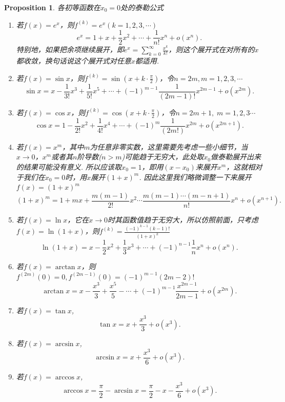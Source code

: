 \documentclass{article}
\newtheorem{proposition}[theorem]{Proposition}
\begin{document}
\begin{proposition}
\rm {\color{red}各初等函数在$x_0 = 0$处的泰勒公式}
\begin{enumerate}
	\item {\color{red}若$f(x) = e^x$}，则$f^{(k)} = e^x(k=1,2,3,\cdots)$
	$$
	e^x = 1 + x + \frac{1}{2}x^2 + \cdots + \frac{1}{n!}x^n + o(x^n). 
	$$
	特别地，如果把余项继续展开，即$e^x =\sum\limits_{k=0}^{\infty}\frac{x^k}{k!}$，则这个展开式在对所有的$x$都收敛，换句话说这个展开式对任意$x$都适用.
	\item {\color{red}若$f(x) = \sin x$}，则$f^{(k)} = \sin (x+ k\cdot \frac{\pi}{2})$，令$n=2m, m = 1,2,3,\cdots$
	$$
	\sin x = x - \frac{1}{3!}x^3 + \frac{1}{5!}x^5 + \cdots + (-1)^{m-1}\frac{1}{(2m-1)!}x^{2m-1}+o(x^{2m}).
	$$
	\item {\color{red}若$f(x) = \cos x$}，则$f^{(k)} = \cos (x+k\cdot \frac{\pi}{2})$，令$n=2m+1,\; m = 1,2,3\cdots$
	$$
	\cos x = 1 - \frac{1}{2!}x^2 + \frac{1}{4!}x^4 + \cdots + (-1)^{m} \frac{1}{(2m!)}x^{2m} + o(x^{2m+1}).
	$$
	\item {\color{red}若$f(x)=x^m$}，其中$m$为任意非零实数，这里需要先考虑一些小细节，当$x \rightarrow 0$，$x^m$或者其$n$阶导数($n > m$)可能趋于无穷大，此处取$x_0$做泰勒展开出来的结果可能没有意义. 所以应该取$x_0 = 1$，即用$(x-x_0)$来展开$x^m$，这就相对于我们在$x_0 = 0$时，用$x$展开$(1+x)^m$. 因此这里我们略微调整一下来展开$f(x) = (1+x)^m$
	$$
	(1+x)^m = 1 + mx + \frac{m(m-1)}{2!}x^2 \cdots \frac{m(m-1)\cdots(m-n+1)}{n!}x^n + o(x^{n+1}).
	$$
	\item {\color{red}若$f(x) = \ln x$}，它在$x \rightarrow 0$时其函数值趋于无穷大，所以仿照前面，只考虑$f(x) = \ln (1+x)$，则$f^{(k)} = \frac{(-1)^{k-1}(k-1)!}{(1+x)^k}$
	$$
	\ln (1+x) = x - \frac{1}{2} x^2 + \frac{1}{3}x^3 +\cdots + (-1)^{n-1}\frac{1}{n}x^n + o(x^{n}).
	$$
	\item {\color{red}若$f(x) = \arctan x$}，则$f^{(2m)}(0) = 0,f^{(2m-1)}(0) = (-1)^{m-1}(2m-2)!$
	$$
	\arctan x = x-\frac{x^3}{3} + \frac{x^5}{5} - \cdots + (-1)^{m-1}\frac{x^{2m-1}}{2m-1} + o(x^{2m}).
	$$
	\item 若{\color{red}$f(x) = \tan x$},
	$$
	\tan x =x + \frac{x^3}{3} + o(x^3).
	$$
	\item 若{\color{red}$f(x) = \arcsin x$},
	$$
	\arcsin x = x + \frac{x^3}{6} + o(x^3).
	$$
	\item 若{\color{red}$f(x) = \arccos x$},
	$$
	\arccos x = \frac{\pi}{2} - \arcsin x = \frac{\pi}{2} - x -\frac{x^3}{6} + o(x^3). 
	$$
\end{enumerate}
\end{proposition}
\end{document}
